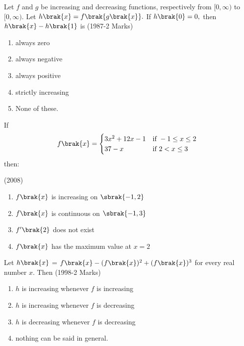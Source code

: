         \item
	Let $f$ and $g$ be increasing and decreasing functions, respectively from $[0,\infty)$ to $[0,\infty)$. Let $h\brak{x} = f\brak{g\brak{x}}.$ If $h\brak{0} = 0,$ then $h\brak{x}-h\brak{1}$ is
	 \hfill(1987-2 Marks)
        \begin{enumerate}
          \item always zero
          \item always negative
          \item always positive
          \item strictly increasing
          \item None of these.\\
        \end{enumerate}

       \item 
       If 
	\begin{align*}
	 f\brak{x}=\begin{cases} 
	 3x^2+12x-1 & \text{if }-1 \le x\le 2\\
	 37-x & \text{if } 2<x \le 3 
         \end{cases}
       \end{align*}then:

	 \hfill(2008)
       \begin{enumerate}
	 \item $f\brak{x}$ is increasing on $\sbrak{-1,2}$
	 \item $f\brak{x}$ is continuous on $\sbrak{-1,3}$
	 \item $f^{\prime}\brak{2}$ does not exist
	 \item $f\brak{x}$ has the maximum value at $x=2$\\
       \end{enumerate}

     \item
	     Let $h\brak{x}$ = $f\brak{x}-(f\brak{x})^2+ (f\brak{x})^3$  for every real number $x.$ Then
     \hfill(1998-2 Marks)\\
     \begin{enumerate}
      \item $h$ is increasing whenever $f$ is increasing
      \item $h$ is increasing whenever $f$ is decreasing
      \item $h$ is decreasing whenever $f$ is decreasing
      \item nothing can be said in general.\\
     \end{enumerate}

